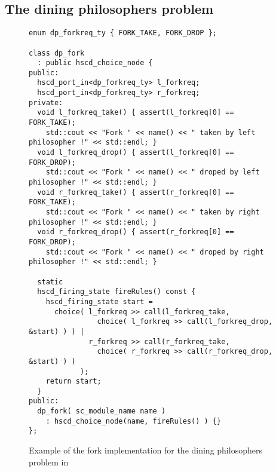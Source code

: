 \subsection{The dining philosophers problem}

\begin{figure}
\centering
\begin{verbatim}
enum dp_forkreq_ty { FORK_TAKE, FORK_DROP };

class dp_fork
  : public hscd_choice_node {
public:
  hscd_port_in<dp_forkreq_ty> l_forkreq;
  hscd_port_in<dp_forkreq_ty> r_forkreq;
private:
  void l_forkreq_take() { assert(l_forkreq[0] == FORK_TAKE);
    std::cout << "Fork " << name() << " taken by left philosopher !" << std::endl; }
  void l_forkreq_drop() { assert(l_forkreq[0] == FORK_DROP);
    std::cout << "Fork " << name() << " droped by left philosopher !" << std::endl; }
  void r_forkreq_take() { assert(r_forkreq[0] == FORK_TAKE);
    std::cout << "Fork " << name() << " taken by right philosopher !" << std::endl; }
  void r_forkreq_drop() { assert(r_forkreq[0] == FORK_DROP);
    std::cout << "Fork " << name() << " droped by right philosopher !" << std::endl; }
  
  static
  hscd_firing_state fireRules() const {
    hscd_firing_state start =
      choice( l_forkreq >> call(l_forkreq_take,
                choice( l_forkreq >> call(l_forkreq_drop, &start) ) ) |
              r_forkreq >> call(r_forkreq_take,
                choice( r_forkreq >> call(r_forkreq_drop, &start) ) )
            );
    return start;
  }
public:
  dp_fork( sc_module_name name )
    : hscd_choice_node(name, fireRules() ) {}
};
\end{verbatim}
\caption{\label{dining-philosophers-fork-systemoc}
  Example of the fork implementation for the
  dining philosophers problem in \SysteMoC{}}
\end{figure}


